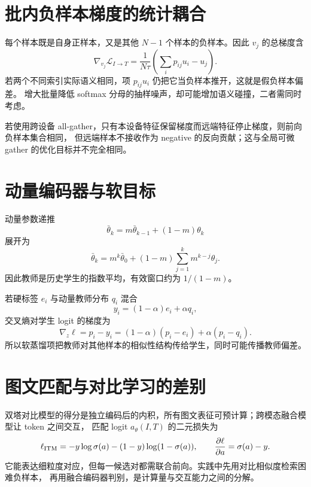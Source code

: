 \documentclass[11pt]{article}
\numberwithin{equation}{section}
\newcommand{\1}{\mathbf{1}}
\newcommand{\cL}{\mathcal{L}}
\begin{document}
\section{批内负样本梯度的统计耦合}

每个样本既是自身正样本，又是其他 $N-1$ 个样本的负样本。因此 $v_j$ 的总梯度含
\begin{equation}
 \nabla_{v_j}\cL_{I\to T}
 =\frac1{N\tau}\left(\sum_i p_{ij}u_i-u_j\right).
\end{equation}
若两个不同索引实际语义相同，项 $p_{ij}u_i$ 仍把它当负样本推开，这就是假负样本偏差。
增大批量降低 softmax 分母的抽样噪声，却可能增加语义碰撞，二者需同时考虑。

若使用跨设备 all-gather，只有本设备特征保留梯度而远端特征停止梯度，则前向负样本集合相同，
但远端样本不接收作为 negative 的反向贡献；这与全局可微 gather 的优化目标并不完全相同。

\section{动量编码器与软目标}

动量参数递推
\begin{equation}
 \bar\theta_k=m\bar\theta_{k-1}+(1-m)\theta_k
\end{equation}
展开为
\begin{equation}
 \bar\theta_k=m^k\bar\theta_0+(1-m)
 \sum_{j=1}^{k}m^{k-j}\theta_j.
\end{equation}
因此教师是历史学生的指数平均，有效窗口约为 $1/(1-m)$。

若硬标签 $e_i$ 与动量教师分布 $q_i$ 混合
\begin{equation}
 y_i=(1-\alpha)e_i+\alpha q_i,
\end{equation}
交叉熵对学生 logit 的梯度为
\begin{equation}
 \nabla_z\ell=p_i-y_i
 =(1-\alpha)(p_i-e_i)+\alpha(p_i-q_i).
\end{equation}
所以软蒸馏项把教师对其他样本的相似性结构传给学生，同时可能传播教师偏差。

\section{图文匹配与对比学习的差别}

双塔对比模型的得分是独立编码后的内积，所有图文表征可预计算；跨模态融合模型让 token 之间交互，
匹配 logit $a_\theta(I,T)$ 的二元损失为
\begin{equation}
 \ell_{\rm ITM}=-y\log\sigma(a)-(1-y)\log(1-\sigma(a)),
\qquad
 \frac{\partial\ell}{\partial a}=\sigma(a)-y.
\end{equation}
它能表达细粒度对应，但每一候选对都需联合前向。实践中先用对比相似度检索困难负样本，
再用融合编码器判别，是计算量与交互能力之间的分解。
\end{document}
